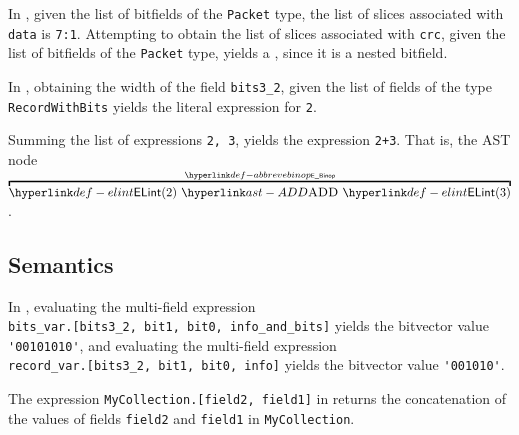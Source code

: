 In ,
given the list of bitfields of the \verb|Packet| type,
the list of slices associated with
\verb|data| is \verb|7:1|.
Attempting to obtain the list of slices associated with
\verb|crc|, given the list of bitfields of the \verb|Packet| type,
yields a \typingerrorterm, since it is a nested bitfield.



In ,
obtaining the width of the field \verb|bits3_2|,
given the list of fields of the type \verb|RecordWithBits|
yields the literal expression for \verb|2|.



Summing the list of expressions \verb|2, 3|,
yields the expression \verb|2+3|. That is, the AST node
$\AbbrevEBinop{\ADD}{\ELInt{2}}{\ELInt{3}}$.


\subsection{Semantics}
In ,
evaluating the multi-field expression \\
\verb|bits_var.[bits3_2, bit1, bit0, info_and_bits]|
yields the bitvector value \\
\verb|'00101010'|,
and evaluating the multi-field expression \\
\verb|record_var.[bits3_2, bit1, bit0, info]|
yields the bitvector value \verb|'001010'|.



The expression \verb|MyCollection.[field2, field1]| in
returns the concatenation of the values of fields \verb|field2| and \verb|field1|
in \verb|MyCollection|.

